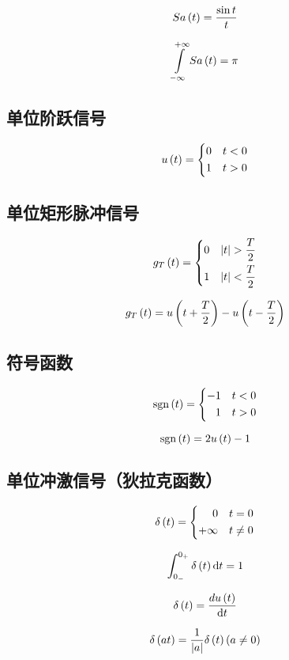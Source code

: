 \documentclass{article}
\begin{document}
\[Sa\left(t\right)=\frac{\sin t}t\]

\[\impint Sa\pare{t}=\pi\]

\subsection{单位阶跃信号}

\[u\left(t\right)=
    \left\{\begin{aligned}
        0 &  & t<0 \\
        1 &  & t>0
    \end{aligned}\right.\]

\subsection{单位矩形脉冲信号}

\[g_T\pare{t}=
    \left\{\begin{aligned}
        0 &  & \abs{t}>\frac T2 \\
        1 &  & \abs{t}<\frac T2
    \end{aligned}\right.\]

\[g_T\left(t\right)=u\left(t+\frac T2\right)-u\left(t-\frac T2\right)\]

\subsection{符号函数}

\[\mathrm{sgn}\left(t\right)=
    \left\{\begin{aligned}
        -1 &  & t<0 \\
        1  &  & t>0
    \end{aligned}\right.\]

\[\mathrm{sgn}\left(t\right)=2u\left(t\right)-1\]

\subsection{单位冲激信号（狄拉克函数）}

\[\delta\left(t\right)=
    \left\{\begin{aligned}
        0       &  & t=0    \\
        +\infty &  & t\neq0
    \end{aligned}\right.\]

\[\int_{0_-}^{0_+}\delta\left(t\right)\mathrm d t=1\]

\[\delta\left(t\right)=\frac{d u\left(t\right)}{\mathrm d t}\]

\[\delta\left(at\right)=\frac1{\left|a\right|}\delta\left(t\right)\left(a\neq0\right)\]
\end{document}
